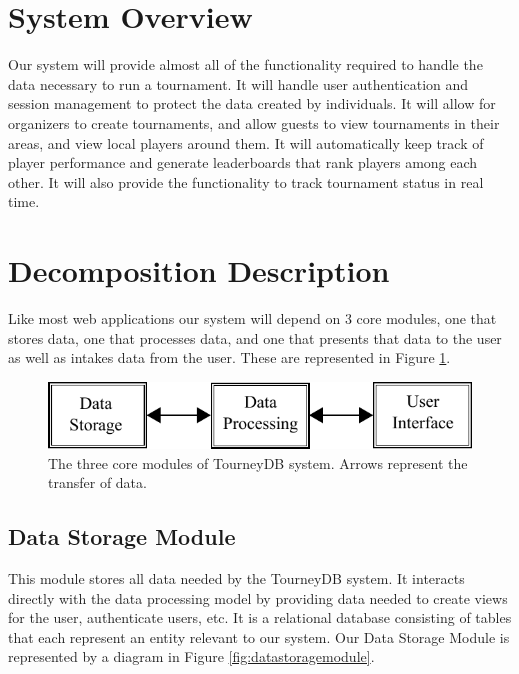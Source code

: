 \documentclass{article}
\begin{document}
\pagebreak


\section{System Overview}
Our system will provide almost all of the functionality required to handle the data necessary to run a tournament. It will handle user authentication and session management to protect the data created by individuals. It will allow for organizers to create tournaments, and allow guests to view tournaments in their areas, and view local players around them. It will automatically keep track of player performance and generate leaderboards that rank players among each other. It will also provide the functionality to track tournament status in real time.

\section{Decomposition Description}
    
Like most web applications our system will depend on 3 core modules, one that stores data, one that processes data, and one that presents that data to the user as well as intakes data from the user. These are represented in Figure \ref{fig:coremodules}.

\begin{figure}[H]
      \centering
      \includegraphics[width=.8\linewidth]{Figures/CoreModules.pdf}
      \caption{The three core modules of TourneyDB system. Arrows represent the transfer of data.}
      \label{fig:coremodules}
\end{figure}

\subsection{Data Storage Module}
This module stores all data needed by the TourneyDB system. It interacts directly with the data processing model by providing data needed to create views for the user, authenticate users, etc. It is a relational database consisting of tables that each represent an entity relevant to our system. Our Data Storage Module is represented by a diagram in Figure \ref{fig:datastoragemodule}.
\end{document}

